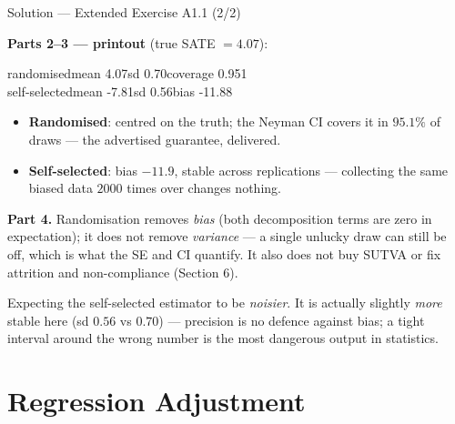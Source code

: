 \documentclass[aspectratio=169,11pt]{beamer}
\begin{document}
\begin{frame}{Solution --- Extended Exercise A1.1 (2/2)}
\begin{solutionbox}
  \textbf{Parts 2--3 --- printout} (true SATE $= 4.07$):
  \begin{center}\ttfamily\footnotesize
  randomised\quad mean 4.07\quad sd 0.70\quad coverage 0.951\\[2pt]
  self-selected\quad mean -7.81\quad sd 0.56\quad bias -11.88
  \end{center}
  \begin{itemize}
    \item \textbf{Randomised}: centred on the truth; the Neyman CI covers it in
          $95.1\%$ of draws --- the advertised guarantee, delivered.
    \item \textbf{Self-selected}: bias $-11.9$, stable across replications ---
          collecting the same biased data $2000$ times over changes nothing.
  \end{itemize}
  \textbf{Part 4.} Randomisation removes \emph{bias} (both decomposition terms are zero
  in expectation); it does not remove \emph{variance} --- a single unlucky draw can still
  be off, which is what the SE and CI quantify. It also does not buy SUTVA or fix
  attrition and non-compliance (Section 6).
\end{solutionbox}
\begin{mistake}
  Expecting the self-selected estimator to be \emph{noisier}. It is actually slightly
  \emph{more} stable here (sd $0.56$ vs $0.70$) --- precision is no defence against bias;
  a tight interval around the wrong number is the most dangerous output in statistics.
\end{mistake}
\end{frame}

\section{Regression Adjustment}
\end{document}
